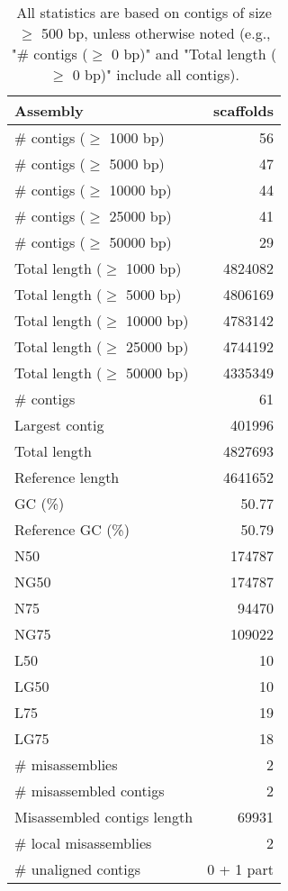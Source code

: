 \documentclass[12pt,a4paper]{article}
\begin{document}
\begin{table}[ht]
\begin{center}
\caption{All statistics are based on contigs of size $\geq$ 500 bp, unless otherwise noted (e.g., "\# contigs ($\geq$ 0 bp)" and "Total length ($\geq$ 0 bp)" include all contigs).}
\begin{tabular}{|l*{1}{|r}|}
\hline
Assembly & scaffolds \\ \hline
\# contigs ($\geq$ 1000 bp) & 56 \\ \hline
\# contigs ($\geq$ 5000 bp) & 47 \\ \hline
\# contigs ($\geq$ 10000 bp) & 44 \\ \hline
\# contigs ($\geq$ 25000 bp) & 41 \\ \hline
\# contigs ($\geq$ 50000 bp) & 29 \\ \hline
Total length ($\geq$ 1000 bp) & 4824082 \\ \hline
Total length ($\geq$ 5000 bp) & 4806169 \\ \hline
Total length ($\geq$ 10000 bp) & 4783142 \\ \hline
Total length ($\geq$ 25000 bp) & 4744192 \\ \hline
Total length ($\geq$ 50000 bp) & 4335349 \\ \hline
\# contigs & 61 \\ \hline
Largest contig & 401996 \\ \hline
Total length & 4827693 \\ \hline
Reference length & 4641652 \\ \hline
GC (\%) & 50.77 \\ \hline
Reference GC (\%) & 50.79 \\ \hline
N50 & 174787 \\ \hline
NG50 & 174787 \\ \hline
N75 & 94470 \\ \hline
NG75 & 109022 \\ \hline
L50 & 10 \\ \hline
LG50 & 10 \\ \hline
L75 & 19 \\ \hline
LG75 & 18 \\ \hline
\# misassemblies & 2 \\ \hline
\# misassembled contigs & 2 \\ \hline
Misassembled contigs length & 69931 \\ \hline
\# local misassemblies & 2 \\ \hline
\# unaligned contigs & 0 + 1 part \\ \hline

\end{tabular}
\end{center}
\end{table}
\end{document}
